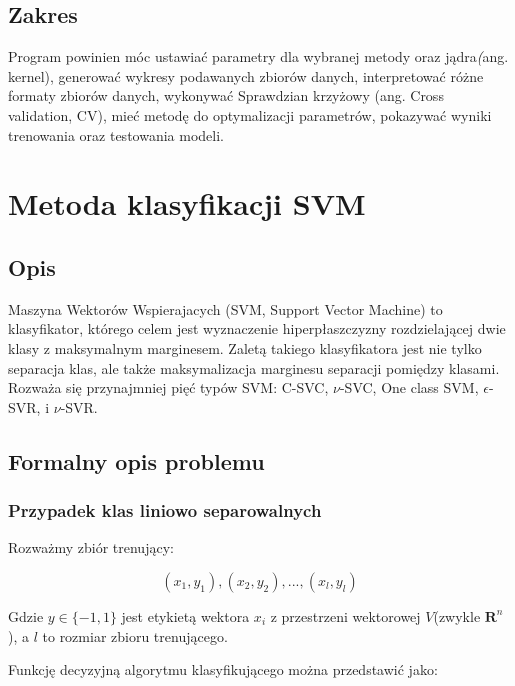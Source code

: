 \documentclass[paper=a4, fontsize=11pt]{scrartcl} %
\numberwithin{equation}{section} %
\numberwithin{figure}{section} %
\begin{document}
\subsection{Zakres}
    Program powinien móc ustawiać parametry dla wybranej metody oraz jądra\textit(ang. kernel), 
    generować wykresy podawanych zbiorów danych, interpretować różne formaty zbiorów danych, 
    wykonywać Sprawdzian krzyżowy (ang. Cross validation, CV), mieć metodę do optymalizacji 
    parametrów, pokazywać wyniki trenowania oraz testowania modeli.
\newpage


\section{Metoda klasyfikacji SVM} %
\subsection{Opis}
    \par Maszyna Wektorów Wspierajacych (SVM, Support Vector Machine) to klasyfikator, którego celem jest wyznaczenie hiperpłaszczyzny
    rozdzielającej dwie klasy z maksymalnym marginesem.  Zaletą takiego klasyfikatora jest nie tylko separacja klas, ale
		także maksymalizacja marginesu separacji pomiędzy klasami. Rozważa się przynajmniej pięć
    typów SVM: C-SVC, $\nu$-SVC, One class SVM, $\epsilon$-SVR, i $\nu$-SVR.
		
\subsection{Formalny opis problemu}
\subsubsection{Przypadek klas liniowo separowalnych}
    \par Rozważmy zbiór trenujący:

    \begin{equation}
        (x_1,y_1),(x_2,y_2),...,(x_l,y_l)
    \end{equation}

    \par Gdzie $y\in\{-1,1\}$ jest etykietą wektora $x_i$ z przestrzeni wektorowej $V$(zwykle
    $\pmb{R}^n$), a $l$ to rozmiar zbioru trenującego.
    \par Funkcję decyzyjną algorytmu
    klasyfikującego można przedstawić jako:
\end{document}
